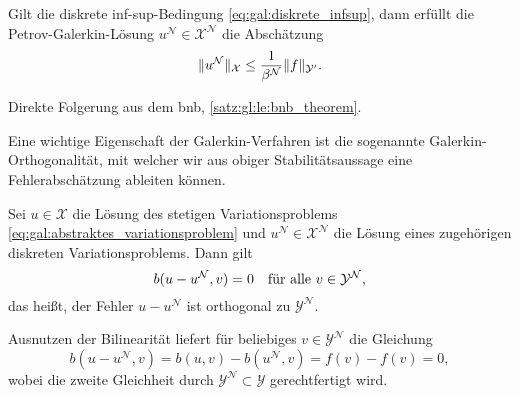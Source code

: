 \begin{Satz}
    \label{satz:gal:stabilitaet}
    Gilt die diskrete inf-sup-Bedingung \cref{eq:gal:diskrete_infsup}, dann erfüllt die Petrov-Galerkin-Lösung $u^{\mathcal N} \in \mathcal X^{\mathcal N}$ die Abschätzung
    \begin{equation}
        \label{eq:gal:statibilitaet}
        \norm{u^{\mathcal N}}_{\mathcal X} \leq \frac{1}{\beta^{\mathcal N}} \norm{f}_{\mathcal Y'}.
    \end{equation}

    \begin{Beweis}
        Direkte Folgerung aus dem \ac{bnb}, \cref{satz:gl:le:bnb_theorem}.
    \end{Beweis}
\end{Satz}

Eine wichtige Eigenschaft der Galerkin-Verfahren ist die sogenannte Galerkin-Orthogonalität, mit welcher wir aus obiger Stabilitätsaussage eine Fehlerabschätzung ableiten können.

\begin{Lemma}
    \label{lemma:gal:galerkin_ortho}
    Sei $u \in \mathcal X$ die Lösung des stetigen Variationsproblems \cref{eq:gal:abstraktes_variationsproblem} und $u^{\mathcal N} \in \mathcal X^{\mathcal N}$ die Lösung eines zugehörigen diskreten Variationsproblems.
    Dann gilt
    \begin{equation}
        \label{eq:gal:galerkin_ortho}
        b(u - u^{\mathcal N}, v) = 0 \quad \fa v \in \mathcal Y^{\mathcal N},
    \end{equation}
    das heißt, der Fehler $u - u^{\mathcal N}$ ist orthogonal zu $\mathcal Y^{\mathcal N}$.

    \begin{Beweis}
        Ausnutzen der Bilinearität liefert für beliebiges $v \in \mathcal Y^{\mathcal N}$ die Gleichung
        \begin{equation}
            b(u - u^{\mathcal N}, v) = b(u, v) - b(u^{\mathcal N}, v) = f(v) - f(v) = 0,
        \end{equation}
        wobei die zweite Gleichheit durch $\mathcal Y^{\mathcal N} \subset \mathcal Y$ gerechtfertigt wird.
    \end{Beweis}
\end{Lemma}

